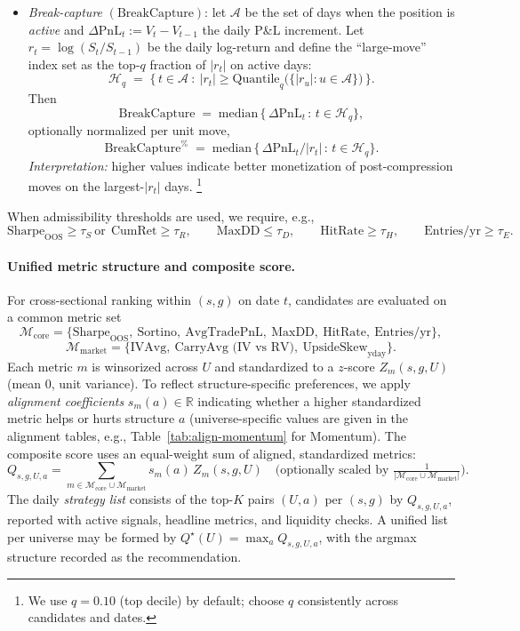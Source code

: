 \documentclass[12pt,a4paper]{report}
\begin{document}
\begin{itemize}
        \item \emph{Break-capture} $(\mathrm{BreakCapture})$:
        let $\mathcal{A}$ be the set of days when the position is \emph{active} and
        $\Delta\mathrm{PnL}_t := V_t - V_{t-1}$ the daily P\&L increment.
        Let $r_t=\log(S_t/S_{t-1})$ be the daily log-return and define the
        “large-move” index set as the top-$q$ fraction of $|r_t|$ on active days:
        \[
        \mathcal{H}_q \;=\; \Big\{\, t\in\mathcal{A}\ :\ |r_t| \ge \mathrm{Quantile}_q\big(\{|r_u|:u\in\mathcal{A}\}\big) \,\Big\}.
        \]
        Then
        \[
        \mathrm{BreakCapture} \;=\; \mathrm{median}\,\big\{\, \Delta\mathrm{PnL}_t \,:\, t\in \mathcal{H}_q \big\},
        \]
        optionally normalized per unit move,
        \[
        \mathrm{BreakCapture}^{\%} \;=\; \mathrm{median}\,\big\{\, \Delta\mathrm{PnL}_t / |r_t| \,:\, t\in \mathcal{H}_q \big\}.
        \]
        \emph{Interpretation:} higher values indicate better monetization of post-compression moves on the largest-$|r_t|$ days.%
        \footnote{We use $q=0.10$ (top decile) by default; choose $q$ consistently across candidates and dates.}



    \end{itemize}
When admissibility thresholds are used, we require, e.g.,
\[
  \mathrm{Sharpe}_{\text{OOS}} \ge \tau_S \ \text{or}\ \ \mathrm{CumRet} \ge \tau_R,\qquad
  \mathrm{MaxDD} \le \tau_D,\qquad
  \mathrm{HitRate} \ge \tau_H,\qquad
  \mathrm{Entries/yr} \ge \tau_E.
\]


\paragraph{Unified metric structure and composite score.}
For cross-sectional ranking within $(s,g)$ on date $t$, candidates are evaluated on a common metric set
\[
\mathcal{M}_{\text{core}}=\{\text{Sharpe}_{\text{OOS}},\ \text{Sortino},\ \text{AvgTradePnL},\ \text{MaxDD},\ \text{HitRate},\ \text{Entries/yr}\},
\]
\[
\mathcal{M}_{\text{market}}=\{\text{IVAvg},\ \text{CarryAvg (IV vs RV)},\ \text{UpsideSkew}_{\text{yday}}\}.
\]
Each metric $m$ is winsorized across $U$ and standardized to a $z$-score $Z_m(s,g,U)$ (mean $0$, unit variance). To reflect structure-specific preferences, we apply \emph{alignment coefficients} $s_m(a)\in\mathbb{R}$ indicating whether a higher standardized metric helps or hurts structure $a$ (universe-specific values are given in the alignment tables, e.g., Table~\ref{tab:align-momentum} for Momentum). The composite score uses an equal-weight sum of aligned, standardized metrics:
\[
Q_{s,g,U,a}=\sum_{m\in \mathcal{M}_{\text{core}}\cup\mathcal{M}_{\text{market}}}
s_m(a)\, Z_m(s,g,U)
\quad\bigg(\text{optionally scaled by } \tfrac{1}{|\mathcal{M}_{\text{core}}\cup\mathcal{M}_{\text{market}}|}\bigg).
\]
The daily \emph{strategy list} consists of the top-$K$ pairs $(U,a)$ per $(s,g)$ by $Q_{s,g,U,a}$, reported with active signals, headline metrics, and liquidity checks. A unified list per universe may be formed by $Q^\star(U)=\max_a Q_{s,g,U,a}$, with the argmax structure recorded as the recommendation.
\end{document}
